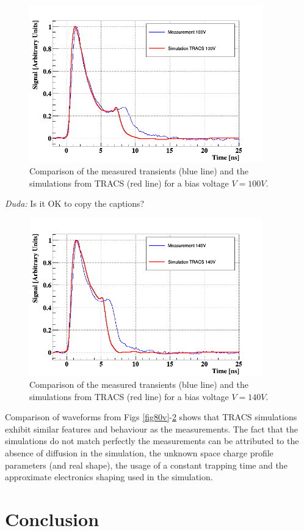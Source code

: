 \begin{figure}[H]
	\centering
	\includegraphics[width=0.9\textwidth]{100V.png}
	\caption{Comparison of the measured transients (blue line) and the simulations from TRACS (red line) for a bias voltage $V = 100V$.}
	\label{fig:100v}
\end{figure}

\emph{Duda: } Is it OK to copy the captions?

\begin{figure}[H]
	\centering
	\includegraphics[width=0.9\textwidth]{140V.png}
	\caption{Comparison of the measured transients (blue line) and the simulations from TRACS (red line) for a bias voltage $V = 140V$.}
	\label{fig:140v}
\end{figure}

Comparison of waveforms from Figs \ref{fig80v}-\ref{fig:140v} shows that TRACS simulations exhibit similar features and behaviour as the measurements. The fact that the simulations do not match perfectly the measurements can be attributed to the absence of diffusion in the simulation, the unknown space charge profile parameters (and real shape), the usage of a constant trapping time and the approximate electronics shaping used in the simulation.

\section{Conclusion}